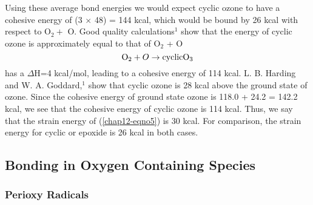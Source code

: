 Using these average bond energies we would expect cyclic ozone
to have a cohesive energy of (3 $\times$ 48) = 144 kcal, which would be 
bound by 26 kcal with respect to O$_2 +$ O.  Good quality 
calculations$^1$ show that the energy of cyclic ozone is 
approximately equal to that of O$_2$ + O
\begin{equation}
\mathrm{O_2} + O \rightarrow \mathrm{cyclic O_3} 
\end{equation}
has a $\Delta$H=4 kcal/mol, leading to a cohesive energy of 114 kcal.
L. B. Harding and W. A.  Goddard,$^1$ show that cyclic ozone is 28
kcal above the ground state of ozone. Since the cohesive energy of
ground state ozone is 118.0 + 24.2 = 142.2 kcal, we see that the
cohesive energy of cyclic ozone is 114 kcal.  Thus, we say that the
strain energy of (\ref{chap12-eqno5}) is 30 kcal.  For comparison, the
strain energy for cyclic  or epoxide is 26 kcal in both
cases.

\subsection{Bonding in Oxygen Containing Species}

\subsubsection{Perioxy Radicals}

